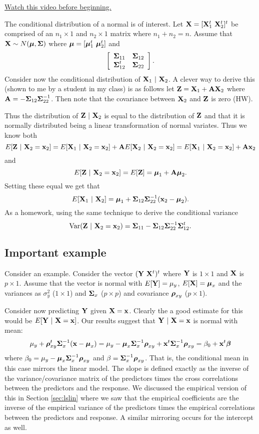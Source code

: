 \href{https://www.youtube.com/watch?v=2VTf-XNmfAk&index=47&list=PLpl-gQkQivXhdgUCdaUQcdb31CRe8Mm2y}{Watch this video before beginning.}

The conditional distribution of a normal is of interest.
Let $\mathbf{X} = [\mathbf{X}_1^t ~ \mathbf{X}_2^t]^t$ be comprised of an $n_1 \times 1$
and $n_2 \times 1$ matrix where $n_1 + n_2  = n$. Assume that
$\mathbf{X} \sim N(\boldsymbol{\mu}, \boldsymbol{\Sigma})$ where $\boldsymbol{\mu} = [\boldsymbol{\mu}_1^t ~ \boldsymbol{\mu}_2^t]$
and 
$$
\left[
\begin{array}{cc}
\boldsymbol{\Sigma}_{11} & \boldsymbol{\Sigma}_{12} \\
\boldsymbol{\Sigma}_{12}^t & \boldsymbol{\Sigma}_{22}
\end{array}
\right].
$$
Consider now the conditional distribution of $\mathbf{X}_1 ~|~ \mathbf{X}_2$. 
A clever way to derive this (shown to me by a student in my class)
is as follows let $\mathbf{Z} = \mathbf{X}_1 + \mathbf{A} \mathbf{X}_2$
where $\mathbf{A} = - \boldsymbol{\Sigma}_{12}\boldsymbol{\Sigma}_{22}^{-1}$. Then note that
the covariance between $\mathbf{X}_2$ and $\mathbf{Z}$ is zero (HW).

Thus the distribution of $\mathbf{Z} ~|~ \mathbf{X}_2$ is equal
to the distribution of $\mathbf{Z}$ and that it is normally distributed
being a linear transformation of normal variates. Thus we know both
$$
E[\mathbf{Z} ~|~ \mathbf{X}_2 = \mathbf{x}_2] = E[\mathbf{X}_1 ~|~ \mathbf{X}_2 = \mathbf{x}_2] + \mathbf{A} E[\mathbf{X}_2 ~|~ \mathbf{X}_2 = \mathbf{x}_2]
= E[\mathbf{X}_1 ~|~ \mathbf{X}_2 = \mathbf{x}_2] + \mathbf{A} \mathbf{x}_2
$$
and
$$
E[\mathbf{Z} ~|~ \mathbf{X}_2 = \mathbf{x}_2] = E[\mathbf{Z}] = \boldsymbol{\mu}_1 + \mathbf{A} \boldsymbol{\mu}_2.
$$
Setting these equal we get that
$$
E[\mathbf{X}_1 ~|~ \mathbf{X}_2] = \boldsymbol{\mu}_1 + \boldsymbol{\Sigma}_{12}\boldsymbol{\Sigma}_{22}^{-1} (\mathbf{x}_2 - \boldsymbol{\mu}_2).
$$
As a homework, using the same technique to derive the conditional variance
$$
\mbox{Var}(\mathbf{Z} ~|~ \mathbf{X}_2 = \mathbf{x}_2) = \boldsymbol{\Sigma}_{11} - \boldsymbol{\Sigma}_{12} \boldsymbol{\Sigma}_{22}^{-1} \boldsymbol{\Sigma}_{12}^t.
$$

\subsection{Important example}
Consider an example. Consider the vector 
$(\mathbf{Y} ~ \mathbf{X}^t)^t$ where $\mathbf{Y}$ is $1\times 1$ and $\mathbf{X}$ is $p\times 1$. Assume that 
the vector is normal with $E[\mathbf{Y}] = \mu_y$, $E[\mathbf{X}] = \boldsymbol{\mu}_x$ and the variances
as $\sigma^2_y$ ($1\times 1$) and $\boldsymbol{\Sigma}_x$ ($p\times p$) 
and covariance $\boldsymbol{\rho}_{xy}$ ($p \times 1$).

Consider now predicting $\mathbf{Y}$ given $\mathbf{X} = \mathbf{x}$. Clearly the a good estimate
for this would be $E[\mathbf{Y} ~|~ \mathbf{X} = \mathbf{x}]$. Our results
suggest that $\mathbf{Y} ~|~ \mathbf{X} = \mathbf{x}$ is normal with mean:
$$
\mu_y + \boldsymbol{\rho}_{xy}^t\boldsymbol{\Sigma}_x^{-1} (\mathbf{x} - \boldsymbol{\mu}_x)
= \mu_y - \boldsymbol{\mu}_x \boldsymbol{\Sigma}_x^{-1}\boldsymbol{\rho}_{xy} + \mathbf{x}^t \boldsymbol{\Sigma}_x^{-1} \boldsymbol{\rho}_{xy}
= \beta_0 + \mathbf{x}^t \boldsymbol{\beta}
$$
where $\beta_0 = \mu_y - \boldsymbol{\mu}_x \boldsymbol{\Sigma}_x^{-1}\boldsymbol{\rho}_{xy}$ and $\beta = \boldsymbol{\Sigma}_x^{-1} \boldsymbol{\rho}_{xy}$. That is, the conditional mean in this case mirrors the
linear model. The slope is defined exactly as the inverse of the variance/covariance matrix
of the predictors times the cross correlations between the predictors and the response.
We discussed the empirical version of this in Section \ref{sec:lslin} where we
saw that the empirical coefficients are the inverse of the empirical variance of 
the predictors times the empirical correlations between the predictors and response. 
A similar mirroring occurs for the intercept as well. 

